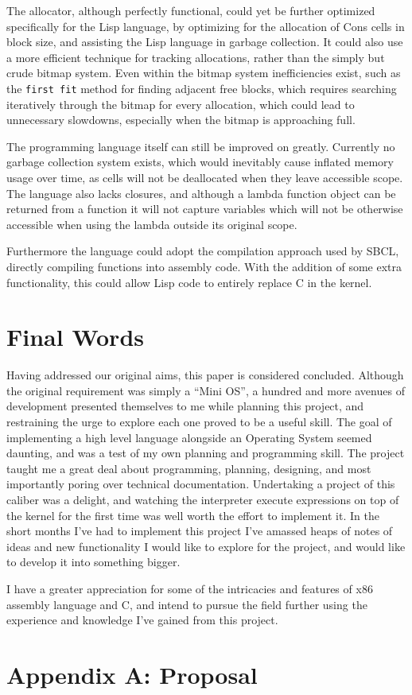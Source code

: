 \documentclass[10pt]{report}
\begin{document}
The allocator, although perfectly functional, could yet be further optimized specifically for the Lisp language, by optimizing for the allocation of Cons cells in block size, and assisting the Lisp language in garbage collection. It could also use a more efficient technique for tracking allocations, rather than the simply but crude bitmap system. Even within the bitmap system inefficiencies exist, such as the \texttt{first fit} method for finding adjacent free blocks, which requires searching iteratively through the bitmap for every allocation, which could lead to unnecessary slowdowns, especially when the bitmap is approaching full.

The programming language itself can still be improved on greatly. Currently no garbage collection system exists, which would inevitably cause inflated memory usage over time, as cells will not be deallocated when they leave accessible scope. The language also lacks closures, and although a lambda function object can be returned from a function it will not capture variables which will not be otherwise accessible when using the lambda outside its original scope.

Furthermore the language could adopt the compilation approach used by SBCL, directly compiling functions into assembly code. With the addition of some extra functionality, this could allow Lisp code to entirely replace C in the kernel.

\section{Final Words}
Having addressed our original aims, this paper is considered concluded. Although the original requirement was simply a ``Mini OS'', a hundred and more avenues of development presented themselves to me while planning this project, and restraining the urge to explore each one proved to be a useful skill. The goal of implementing a high level language alongside an Operating System seemed daunting, and was a test of my own planning and programming skill. The project taught me a great deal about programming, planning, designing, and most importantly poring over technical documentation. Undertaking a project of this caliber was a delight, and watching the interpreter execute expressions on top of the kernel for the first time was well worth the effort to implement it. In the short months I've had to implement this project I've amassed heaps of notes of ideas and new functionality I would like to explore for the project, and would like to develop it into something bigger.

I have a greater appreciation for some of the intricacies and features of x86 assembly language and C, and intend to pursue the field further using the experience and knowledge I've gained from this project.

\begingroup
\sloppy
\RaggedRight


\endgroup

\newpage
\appendix
\section{Appendix A: Proposal}
\end{document}

